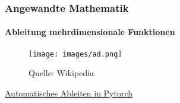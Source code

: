 \documentclass{beamer}
\begin{document}
\begin{frame}
    \frametitle{Angewandte Mathematik}
\framesubtitle{Ableitung mehrdimensionale Funktionen}
\begin{figure}[H]
      \centering
    \texttt{[image: images/ad.png]}
      \caption{Quelle: Wikipedia}
\end{figure}

\href{https://pytorch.org/tutorials/beginner/blitz/autograd_tutorial.html}{Automatisches Ableiten  in Pytorch}

 \end{frame}
\end{document}
